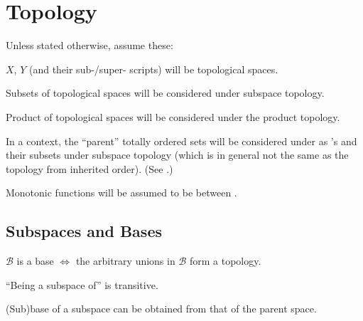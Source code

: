 \chapter{Topology}

\begin{conv}
	Unless stated otherwise, assume these:
	\begin{convlist}
		\item $X$, $Y$ (and their sub-/super- scripts) will be topological spaces.
		
		\item Subsets of topological spaces will be considered under subspace topology.
		
		\item Product of topological spaces will be considered under the product topology.
		
		\item In a context, the ``parent'' totally ordered sets will be considered under as \LOTS's and their subsets under subspace topology (which is in general not the same as the topology from inherited order). (See .)
		
		\item Monotonic functions will be assumed to be between \LOTS.
	\end{convlist}
\end{conv}



\section{Subspaces and Bases}

	\begin{lem}
		$\mathscr B$ is a base $\iff$ the arbitrary unions in $\mathscr B$ form a topology.
	\end{lem}
	
	\begin{lem}\label{LEM: subspaces and bases}
		\leavevmode
		\begin{mylist}
			\item ``Being a subspace of'' is transitive.
			
			\item\label{LEMii: subspaces and bases} (Sub)base of a subspace can be obtained from that of the parent space.
		\end{mylist}
	\end{lem}
	
	
	
